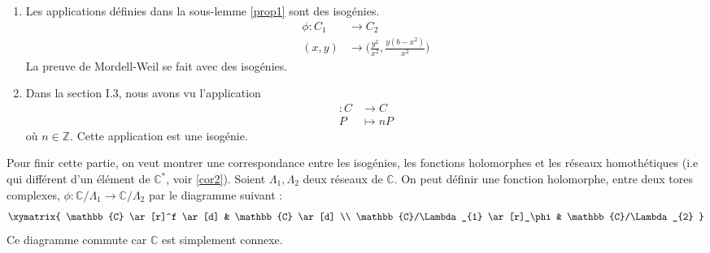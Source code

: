 \documentclass[a4paper]{article}
\begin{document}
\begin{ex}
\begin{enumerate}
\item \normalfont  Les applications définies dans la sous-lemme \ref{prop1} sont des isogénies.
\begin{align*}
\phi : C_{1} &\rightarrow C_{2}  \\
(x,y) &\rightarrow \Big(\frac{y^2}{x^2},\frac{y(b-x^2)}{x^2} \Big) 
\end{align*}
La preuve de Mordell-Weil se fait avec des isogénies.
\item
Dans la section I.3, nous avons vu l'application
\begin{align*}
[n] : C &\rightarrow C \\
P &\mapsto nP
\end{align*}
où $n \in \mathbb{Z}$. Cette application est une isogénie. 
\end{enumerate}
\end{ex}
\noindent Pour finir cette partie, on veut montrer une correspondance entre les isogénies, les fonctions holomorphes et les réseaux homothétiques (i.e qui différent d'un élément de $\mathbb{C}^*$, voir \ref{cor2}).
\noindent Soient $\Lambda_{1},\Lambda_{2}$ deux réseaux de $\mathbb{C}$. On peut définir une fonction holomorphe, entre deux tores complexes, $\phi :\mathbb{C}/\Lambda_{1} \rightarrow \mathbb{C}/\Lambda_{2}$ par le diagramme suivant : 
\begin{equation*}
\xymatrix{
    \mathbb{C} \ar[r]^f \ar[d] & \mathbb{C} \ar[d] \\
    \mathbb{C}/\Lambda_{1} \ar[r]_\phi & \mathbb{C}/\Lambda_{2}
  }
\end{equation*}
Ce diagramme commute car $\mathbb{C}$ est simplement connexe.
\end{document}
